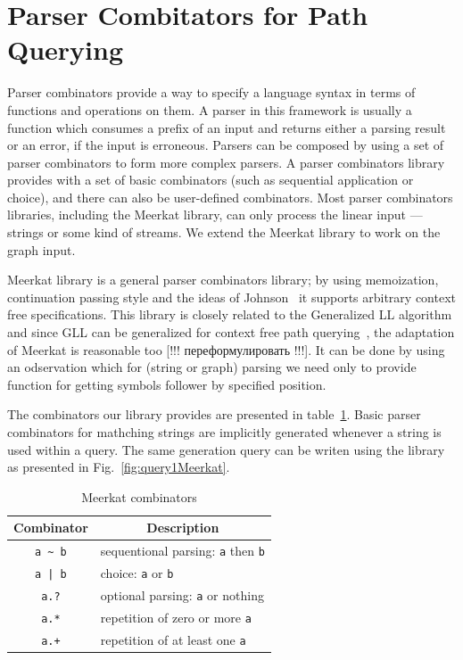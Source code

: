  \section{Parser Combitators for Path Querying}

Parser combinators provide a way to specify a language syntax in terms of functions and operations on them. 
A parser in this framework is usually a function which consumes a prefix of an input and returns either a parsing result or an error, if the input is erroneous. 
Parsers can be composed by using a set of parser combinators to form more complex parsers. 
A parser combinators library provides with a set of basic combinators (such as sequential application or choice), and there can also be user-defined combinators. 
Most parser combinators libraries, including the Meerkat library, can only process the linear input --- strings or some kind of streams. 
We extend the Meerkat library to work on the graph input.

Meerkat library is a general parser combinators library; by using memoization, continuation passing style and the ideas of Johnson~\cite{Johnson} it supports arbitrary context free specifications. 
This library is closely related to the Generalized LL algorithm and since GLL can be generalized for context free path querying~\cite{GrigorevR16}, the adaptation of Meerkat is reasonable too [!!! переформулировать !!!]. 
It can be done by using an odservation which for (string or graph) parsing we need only to provide function for getting symbols follower by specified position.

The combinators our library provides are presented in table~\ref{table:combinators}. 
Basic parser combinators for mathching strings are implicitly generated whenever a string is used within a query. 
The same generation query can be writen using the library as presented in Fig.~\ref{fig:query1Meerkat}.

\begin{table}[h]
\centering
\begin{tabular}{c|l}
\multicolumn{1}{c|}{Combinator} & \multicolumn{1}{|c}{Description} \\ \hline
{\lstinline!a ~ b!} & sequentional parsing: {\lstinline!a!} then {\lstinline!b!}   \\
{\lstinline!a | b!} & choice: {\lstinline!a!} or {\lstinline!b!}         \\
{\lstinline!a.?!}   & optional parsing: {\lstinline!a!} or nothing   \\
{\lstinline!a.*!}   & repetition of zero or more {\lstinline!a!} \\
{\lstinline!a.+!}   & repetition of at least one {\lstinline!a!} \\
\end{tabular}
\caption{Meerkat combinators}
\label{table:combinators}
\end{table}


